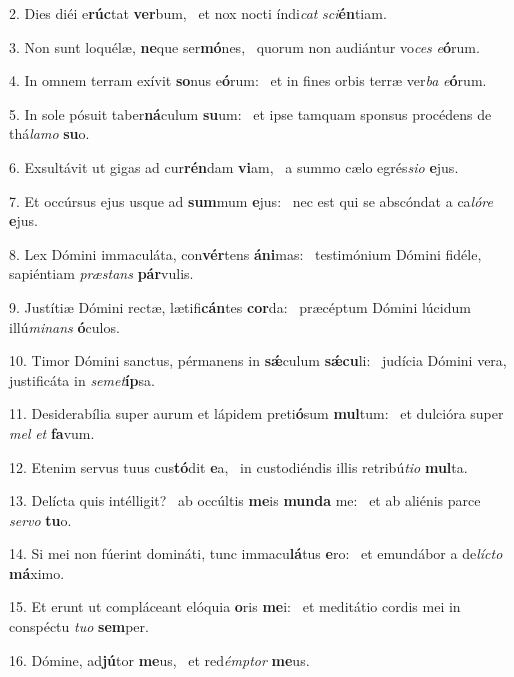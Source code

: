 2. Dies diéi e\textbf{rúc}tat \textbf{ver}bum, \ast\  et nox nocti índi\textit{cat} \textit{sci}\textbf{én}tiam.\

3. Non sunt loquélæ, \textbf{ne}que ser\textbf{mó}nes, \ast\  quorum non audiántur vo\textit{ces} \textit{e}\textbf{ó}rum.\

4. In omnem terram exívit \textbf{so}nus e\textbf{ó}rum: \ast\  et in fines orbis terræ ver\textit{ba} \textit{e}\textbf{ó}rum.\

5. In sole pósuit taber\textbf{ná}culum \textbf{su}um: \ast\  et ipse tamquam sponsus procédens de thá\textit{la}\textit{mo} \textbf{su}o.\

6. Exsultávit ut gigas ad cur\textbf{rén}dam \textbf{vi}am, \ast\  a summo cælo egrés\textit{si}\textit{o} \textbf{e}jus.\

7. Et occúrsus ejus usque ad \textbf{sum}mum \textbf{e}jus: \ast\  nec est qui se abscóndat a ca\textit{ló}\textit{re} \textbf{e}jus.\

8. Lex Dómini immaculáta, con\textbf{vér}tens \textbf{á}\textbf{ni}mas: \ast\  testimónium Dómini fidéle, sapiéntiam \textit{præ}\textit{stans} \textbf{pár}vulis.\

9. Justítiæ Dómini rectæ, lætifi\textbf{cán}tes \textbf{cor}da: \ast\  præcéptum Dómini lúcidum illú\textit{mi}\textit{nans} \textbf{ó}culos.\

10. Timor Dómini sanctus, pérmanens in \textbf{sǽ}culum \textbf{sǽ}\textbf{cu}li: \ast\  judícia Dómini vera, justificáta in \textit{se}\textit{met}\textbf{íp}sa.\

11. Desiderabília super aurum et lápidem preti\textbf{ó}sum \textbf{mul}tum: \ast\  et dulcióra super \textit{mel} \textit{et} \textbf{fa}vum.\

12. Etenim servus tuus cus\textbf{tó}dit \textbf{e}a, \ast\  in custodiéndis illis retribú\textit{ti}\textit{o} \textbf{mul}ta.\

13. Delícta quis intélligit? \dag\  ab occúltis \textbf{me}is \textbf{mun}\textbf{da} me: \ast\  et ab aliénis parce \textit{ser}\textit{vo} \textbf{tu}o.\

14. Si mei non fúerint domináti, tunc immacu\textbf{lá}tus \textbf{e}ro: \ast\  et emundábor a de\textit{líc}\textit{to} \textbf{má}ximo.\

15. Et erunt ut compláceant elóquia \textbf{o}ris \textbf{me}i: \ast\  et meditátio cordis mei in conspéctu \textit{tu}\textit{o} \textbf{sem}per.\

16. Dómine, ad\textbf{jú}tor \textbf{me}us, \ast\  et red\textit{émp}\textit{tor} \textbf{me}us.\

